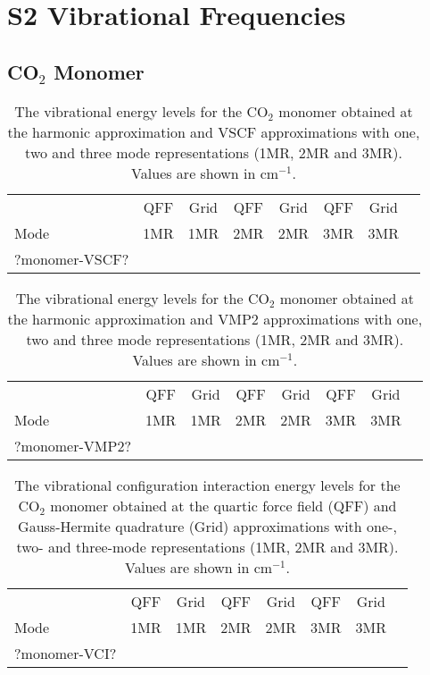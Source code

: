 \documentclass[aip,jcp,showpacs,superscriptaddress,groupedaddress]{revtex4-1}  %
\begin{document}
\section{\label{sec:vibrations}S2 Vibrational Frequencies}



\subsection{\label{sec:monomer-freq}CO$_2$ Monomer}

\begin{table}[b]
\caption{The vibrational energy levels for the CO$_2$ monomer obtained at the harmonic approximation and VSCF approximations with one, two and three mode representations (1MR, 2MR and 3MR). Values are shown in cm$^{-1}$.}
\begin{ruledtabular}
\begin{tabular}{lccccccc}
    & QFF &  Grid & QFF & Grid & QFF & Grid   \\  
  Mode & 1MR & 1MR & 2MR & 2MR & 3MR & 3MR   \\ 
\hline \Tstrut
?monomer-VSCF?
\end{tabular}
\end{ruledtabular}
\label{table:monomer-vscf}
\end{table}  

\begin{table}[b]
\caption{The vibrational energy levels for the CO$_2$ monomer obtained at the harmonic approximation and VMP2 approximations with one, two and three mode representations (1MR, 2MR and 3MR). Values are shown in cm$^{-1}$.}
\begin{ruledtabular}
\begin{tabular}{lccccccc}
    & QFF &  Grid & QFF & Grid & QFF & Grid   \\  
  Mode & 1MR & 1MR & 2MR & 2MR & 3MR & 3MR   \\ 
\hline \Tstrut
?monomer-VMP2?
\end{tabular}
\end{ruledtabular}
\label{table:monomer-vmp2}
\end{table}

\begin{table}[b]
    \caption{The vibrational configuration interaction energy levels for the CO$_2$ monomer obtained at the quartic force field (QFF) and Gauss-Hermite quadrature (Grid) approximations with one-, two- and three-mode representations (1MR, 2MR and 3MR). Values are shown in cm$^{-1}$.}
\begin{ruledtabular}
\begin{tabular}{lccccccc}
    & QFF &  Grid & QFF & Grid & QFF & Grid   \\  
  Mode & 1MR & 1MR & 2MR & 2MR & 3MR & 3MR   \\ 
\hline \Tstrut
?monomer-VCI?
\end{tabular}
\end{ruledtabular}
\label{table:monomer-vci}
\end{table}
\end{document}
